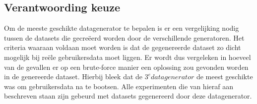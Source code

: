 \documentclass[Main.tex]{subfiles}
\begin{document}
\subsection{Verantwoording keuze}
Om de meeste geschikte datagenerator te bepalen is er een vergelijking nodig tussen de datasets die gecre\"eerd worden door de verschillende generatoren. Het criteria waaraan voldaan moet worden is dat de gegenereerde dataset zo dicht mogelijk bij re\"ele gebruikersdata moet liggen. Er wordt dus vergeleken in hoeveel van de gevallen er op een brute-force manier een oplossing zou gevonden worden in de genereerde dataset. Hierbij bleek dat de $3^{e} datagenerator$ de meest geschikte was om gebruikersdata na te bootsen. Alle experimenten die van hieraf aan beschreven staan zijn gebeurd met datasets gegenereerd door deze datagenerator.
\end{document}
